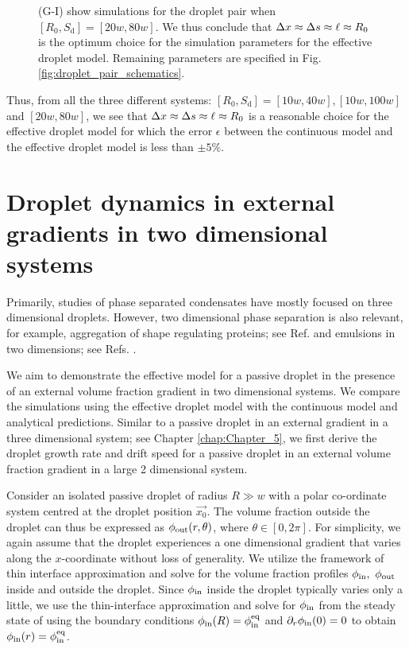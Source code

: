 \begin{appendices}
\begin{figure}[tb]
{\mbox{(G-I)} show simulations for the droplet pair when $[R_0, S_\mathrm{d}] = [20w, 80w]$.
We thus conclude that $\Delta x \approx \Delta s \approx \ell \approx R_0$ is the optimum choice for the simulation parameters for the effective droplet model. 
Remaining parameters are specified in Fig. \ref{fig:droplet_pair_schematics}.
}
\label{fig:robustness_test_case}
\end{figure}
Thus, from all the three different systems: $[R_0, S_\mathrm{d}] = [10w, 40w], [10w, 100w]$ and $[20w, 80w]$, we see that $\Delta x \approx \Delta s \approx \ell \approx R_0$ is a reasonable choice for the effective droplet model for which the error $\epsilon$ between the continuous model and the effective droplet model is less than $\pm 5\%$.


\chapter{Droplet dynamics in external gradients in two dimensional systems}

\label{sec:droplet_gradient_2D}

Primarily, studies of phase separated condensates have mostly focused on three dimensional droplets. 
However, two dimensional phase separation is also relevant, for example, aggregation of shape regulating proteins; see Ref. \cite{gov2018} and emulsions in two dimensions; see Refs. \cite{Zwicker2015,Review2019,Bressloff_2020,Bressloff2020}.

We aim to demonstrate the effective model for a passive droplet in the presence of an external volume fraction gradient in two dimensional systems.
We compare the simulations using the effective droplet model with the continuous model and analytical predictions. 
Similar to a passive droplet in an external gradient in a three dimensional system; see Chapter \ref{chap:Chapter_5}, we first derive the droplet growth rate and drift speed for a passive droplet in an external volume fraction gradient in a large 2 dimensional system.

Consider an isolated passive droplet of radius $R \gg w$ with a polar co-ordinate
system centred at the droplet position $\vec{x_0}$.
The volume fraction outside the droplet can thus be expressed as $\phi_\mathrm{out}(r, \theta)$, where $\theta \in [0, 2\pi]$. 
For simplicity, we again assume that the droplet experiences a one dimensional gradient that varies along the $x$-coordinate without loss of generality.
We utilize the framework of thin interface approximation and solve for the volume fraction profiles $\phi_\mathrm{in},~\phi_\mathrm{out}$ inside and outside the droplet.
Since $\phi_\mathrm{in}$ inside the droplet typically varies only a little, we use the thin-interface approximation and solve for $\phi_\mathrm{in}$ from the steady state of  using the boundary conditions $\phi_\mathrm{in}(R) = \phi^\mathrm{eq}_\mathrm{in}$ and $\partial_r \phi_\mathrm{in} (0) = 0$ to obtain $\phi_\mathrm{in}(r) = \phi^\mathrm{eq}_\mathrm{in}$.


\end{appendices}
